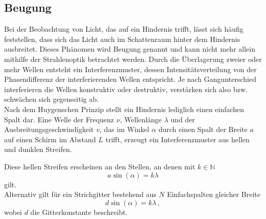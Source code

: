 \subsection*{Beugung}

Bei der Beobachtung von Licht, das auf ein Hindernis trifft, lässt sich häufig feststellen, dass sich das Licht auch im Schattenraum hinter dem Hindernis ausbreitet.
Dieses Phänomen wird Beugung genannt und kann nicht mehr allein mithilfe der Strahlenoptik betrachtet werden.
Durch die Überlagerung zweier oder mehr Wellen entsteht ein Interferenzmuster, dessen Intensitätsverteilung von der Phasendifferenz der interferierenden Wellen entspricht.
Je nach Gangunterschied interferieren die Wellen konstruktiv oder destruktiv, verstärken sich also bzw. schwächen sich gegenseitig ab. \\

Nach dem Huygenschen Prinzip stellt ein Hindernis lediglich einen einfachen Spalt dar. 
Eine Welle der Frequenz $\nu$, Wellenlänge $\lambda$ und der Ausbreitungsgeschwindigkeit $v$, das im Winkel $\alpha$ durch einen Spalt der Breite $a$ auf einen Schirm im Abstand $L$ trifft, erzeugt ein Interferenzmuster
aus hellen und dunklen Streifen.

Diese hellen Streifen erscheinen an den Stellen, an denen mit $k \in \mathbb{N}$
\begin{equation}
    a \sin(\alpha) = k \lambda
    \label{eq:beugmaxeinzspalt}
\end{equation}
gilt. \\

Alternativ gilt für ein Strichgitter bestehend aus $N$ Einfachspalten gleicher Breite
\begin{equation}
    d \sin(\alpha) = k \lambda \,,
\end{equation}
wobei $d$ die Gitterkonstante beschreibt.



